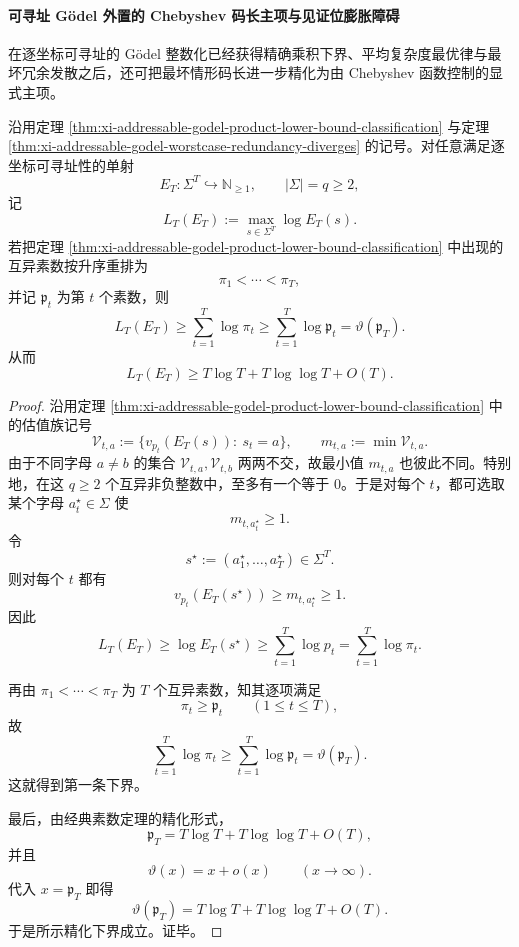 \paragraph{可寻址 Gödel 外置的 Chebyshev 码长主项与见证位膨胀障碍}
在逐坐标可寻址的 Gödel 整数化已经获得精确乘积下界、平均复杂度最优律与最坏冗余发散之后，还可把最坏情形码长进一步精化为由 Chebyshev 函数控制的显式主项。

\begin{theorem}\label{thm:xi-addressable-godel-worstcase-chebyshev-sharp-lower-bound}
沿用定理 \ref{thm:xi-addressable-godel-product-lower-bound-classification} 与定理 \ref{thm:xi-addressable-godel-worstcase-redundancy-diverges} 的记号。对任意满足逐坐标可寻址性的单射
\[
E_T:\Sigma^T\hookrightarrow \mathbb N_{\ge 1},
\qquad
|\Sigma|=q\ge 2,
\]
记
\[
L_T(E_T):=\max_{s\in\Sigma^T}\log E_T(s).
\]
若把定理 \ref{thm:xi-addressable-godel-product-lower-bound-classification} 中出现的互异素数按升序重排为
\[
\pi_1<\cdots<\pi_T,
\]
并记 \(\mathfrak p_t\) 为第 \(t\) 个素数，则
\[
L_T(E_T)
\ge
\sum_{t=1}^{T}\log \pi_t
\ge
\sum_{t=1}^{T}\log \mathfrak p_t
=
\vartheta(\mathfrak p_T).
\]
从而
\[
L_T(E_T)
\ge
T\log T+T\log\log T+O(T).
\]
\end{theorem}
\begin{proof}
沿用定理 \ref{thm:xi-addressable-godel-product-lower-bound-classification} 中的估值族记号
\[
\mathcal V_{t,a}:=
\{v_{p_t}(E_T(s)):\ s_t=a\},
\qquad
m_{t,a}:=\min \mathcal V_{t,a}.
\]
由于不同字母 \(a\neq b\) 的集合 \(\mathcal V_{t,a},\mathcal V_{t,b}\) 两两不交，故最小值 \(m_{t,a}\) 也彼此不同。特别地，在这 \(q\ge 2\) 个互异非负整数中，至多有一个等于 \(0\)。于是对每个 \(t\)，都可选取某个字母 \(a_t^\star\in\Sigma\) 使
\[
m_{t,a_t^\star}\ge 1.
\]
令
\[
s^\star:=(a_1^\star,\dots,a_T^\star)\in\Sigma^T.
\]
则对每个 \(t\) 都有
\[
v_{p_t}(E_T(s^\star))\ge m_{t,a_t^\star}\ge 1.
\]
因此
\[
L_T(E_T)
\ge
\log E_T(s^\star)
\ge
\sum_{t=1}^{T}\log p_t
=
\sum_{t=1}^{T}\log \pi_t.
\]

再由 \(\pi_1<\cdots<\pi_T\) 为 \(T\) 个互异素数，知其逐项满足
\[
\pi_t\ge \mathfrak p_t
\qquad (1\le t\le T),
\]
故
\[
\sum_{t=1}^{T}\log \pi_t
\ge
\sum_{t=1}^{T}\log \mathfrak p_t
=
\vartheta(\mathfrak p_T).
\]
这就得到第一条下界。

最后，由经典素数定理的精化形式，
\[
\mathfrak p_T
=
T\log T+T\log\log T+O(T),
\]
并且
\[
\vartheta(x)=x+o(x)\qquad (x\to\infty).
\]
代入 \(x=\mathfrak p_T\) 即得
\[
\vartheta(\mathfrak p_T)
=
T\log T+T\log\log T+O(T).
\]
于是所示精化下界成立。证毕。
\end{proof}

